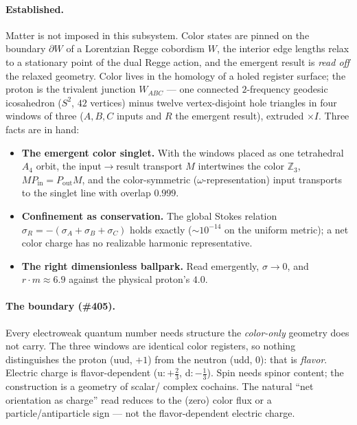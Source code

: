 \documentclass[11pt]{article}
\theoremstyle{definition}
\newcommand{\Z}{\mathbb{Z}}
\newcommand{\sigmacol}{\sigma}
\newcommand{\Pin}{P_{\mathrm{in}}}
\newcommand{\Pout}{P_{\mathrm{out}}}
\begin{document}
\paragraph{Established.} Matter is not imposed in this subsystem. Color states are
pinned on the boundary $\partial W$ of a Lorentzian Regge cobordism $W$, the interior
edge lengths relax to a stationary point of the dual Regge action, and the emergent
result is \emph{read off} the relaxed geometry. Color lives in the homology of a holed
register surface; the proton is the trivalent junction $W_{ABC}$ --- one connected
$2$-frequency geodesic icosahedron ($S^2$, $42$ vertices) minus twelve vertex-disjoint
hole triangles in four windows of three ($A,B,C$ inputs and $R$ the emergent result),
extruded $\times I$. Three facts are in hand:
\begin{itemize}[nosep]
  \item \textbf{The emergent color singlet.} With the windows placed as one
  tetrahedral $A_4$ orbit, the input$\to$result transport $M$ intertwines the color
  $\Z_3$, $M\Pin = \Pout M$, and the color-symmetric ($\omega$-representation) input
  transports to the singlet line with overlap $0.999$.
  \item \textbf{Confinement as conservation.} The global Stokes relation
  $\sigmacol_R = -(\sigmacol_A+\sigmacol_B+\sigmacol_C)$ holds exactly
  ($\sim 10^{-14}$ on the uniform metric); a net color charge has no realizable
  harmonic representative.
  \item \textbf{The right dimensionless ballpark.} Read emergently,
  $\sigmacol\to0$, and $r\!\cdot\!m\approx 6.9$ against the physical proton's $4.0$.
\end{itemize}

\paragraph{The boundary (\#405).} Every electroweak quantum number needs structure the
\emph{color-only} geometry does not carry. The three windows are identical color
registers, so nothing distinguishes the proton (uud, $+1$) from the neutron (udd, $0$):
that is \emph{flavor}. Electric charge is flavor-dependent (u${:}+\tfrac23$,
d${:}-\tfrac13$). Spin needs spinor content; the construction is a geometry of scalar/
complex cochains. The natural ``net orientation as charge'' read reduces to the (zero)
color flux or a particle/antiparticle sign --- not the flavor-dependent electric charge.
\end{document}
